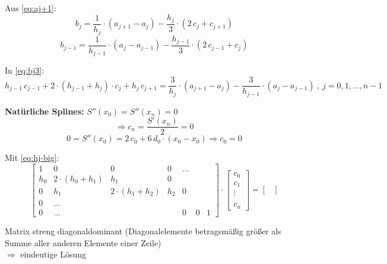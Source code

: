 Aus \autoref{eq:aj+1}:
\begin{equation}
	b_j = \frac{1}{h_j} \cdot (a_{j+1} - a_j) - \frac{h_j}{3} \cdot (2\, c_j + c_{j+1})
	\label{eq:bj3}
\end{equation}
\begin{equation}
	b_{j-1} = \frac{1}{h_{j-1}} \cdot (a_j - a_{j-1}) - \frac{h_{j-1}}{3} \cdot (2\, c_{j-1} + c_j)
\end{equation}

In \autoref{eq:bj3}:
\begin{equation}
	h_{j-1}\, c_{j-1} +2 \cdot (h_{j-1} + h_j) \cdot c_j + h_j\, c_{j+1} = \frac{3}{h_j} \cdot (a_{j+1} - a_j) - \frac{3}{h_{j-1}} \cdot (a_j - a_{j-1})\ , \ j=0,1,\ldots,n-1
	\label{eq:hj-big}
\end{equation}

\textbf{Natürliche Splines: } $S''(x_0) = S''(x_n) = 0$
\begin{equation}
	\Rightarrow c_n = \frac{S'(x_n)}{2} = 0
\end{equation}
\begin{equation}
	0 = S''(x_0) = 2\, c_0 + 6\, d_0 \cdot (x_0 - x_0) \Rightarrow c_0 = 0
\end{equation}

Mit \autoref{eq:hj-big}:
\begin{equation}
	\begin{bmatrix}
	1 & 0 & 0 & 0 & \ldots & & \\
	h_0 & 2\cdot(h_0 + h_1) & h_1 & 0 & & &\\
	0 & h_1 & 2\cdot(h_1 + h_2) & h_2 & 0 & &\\
	0 & \ldots & & & & &\\
	0 & \ldots & & & 0 & 0 & 1
	\end{bmatrix} \cdot \begin{bmatrix}
	c_0 \\ c_1 \\ \vdots \\  \\ c_n
	\end{bmatrix} = \begin{bmatrix}
	\end{bmatrix}
\end{equation}

Matrix streng diagonaldominant (Diagonalelemente betragsmäßig größer als Summe aller anderen Elemente einer Zeile)\\
$\Rightarrow$ eindeutige Lösung


